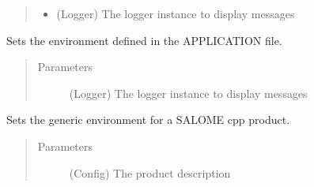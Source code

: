\documentclass[a4paper,10pt,english]{sphinxmanual}
\begin{document}
\begin{fulllineitems}
\begin{fulllineitems}
\begin{quote}
\begin{description}
\begin{itemize}
\item {} 
 \textendash{} (Logger) The logger instance to display messages

\end{itemize}

\end{description}\end{quote}

\end{fulllineitems}


\begin{fulllineitems}
\label{\detokenize{apidoc_src/src:src.environment.SalomeEnviron.set_application_env}}
Sets the environment defined in the APPLICATION file.
\begin{quote}\begin{description}
\item[{Parameters}] \leavevmode
{} \textendash{} (Logger) The logger instance to display messages

\end{description}\end{quote}

\end{fulllineitems}


\begin{fulllineitems}
\label{\detokenize{apidoc_src/src:src.environment.SalomeEnviron.set_cpp_env}}
Sets the generic environment for a SALOME cpp product.
\begin{quote}\begin{description}
\item[{Parameters}] \leavevmode
{} \textendash{} (Config) The product description

\end{description}\end{quote}

\end{fulllineitems}



\end{fulllineitems}
\end{document}
